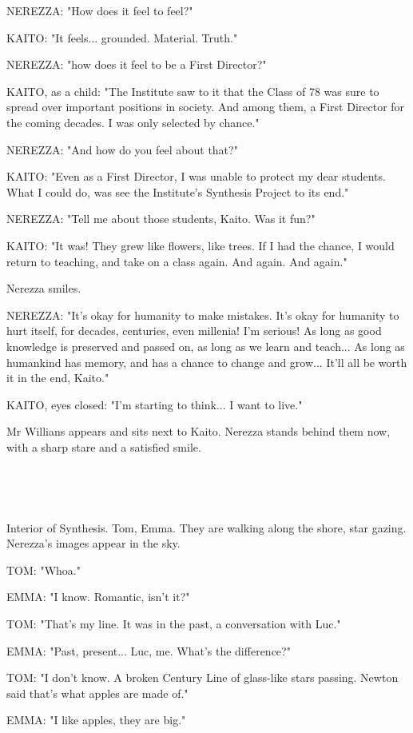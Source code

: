 \documentclass[11pt]{article}
\begin{document}
NEREZZA: "How does it feel to feel?"

KAITO: "It feels... grounded. Material. Truth."

NEREZZA: "how does it feel to be a First Director?"

KAITO, as a child: "The Institute saw to it that the Class of 78 was sure to spread over important positions in society. 
And among them, a First Director for the coming decades.
I was only selected by chance."

NEREZZA: "And how do you feel about that?"

KAITO: "Even as a First Director, I was unable to protect my dear students.
What I could do, was see the Institute's Synthesis Project to its end."

NEREZZA: "Tell me about those students, Kaito. Was it fun?"

KAITO: "It was! They grew like flowers, like trees.
If I had the chance, I would return to teaching, and take on a class again.
And again.
And again."

Nerezza smiles.

NEREZZA: "It's okay for humanity to make mistakes.
It's okay for humanity to hurt itself, for decades, centuries, even millenia!
I'm serious!
As long as good knowledge is preserved and passed on, as long as we learn and teach...
As long as humankind has memory, and has a chance to change and grow...
It'll all be worth it in the end, Kaito."

KAITO, eyes closed: "I'm starting to think...
I want to live."

Mr Willians appears and sits next to Kaito.
Nerezza stands behind them now, with a sharp stare and a satisfied smile.

\ 

\ 

Interior of Synthesis.
Tom, Emma.
They are walking along the shore, star gazing.
Nerezza's images appear in the sky.

TOM: "Whoa."

EMMA: "I know. Romantic, isn't it?"

TOM: "That's my line.
It was in the past, a conversation with Luc."

EMMA: "Past, present... Luc, me. What's the difference?"

TOM: "I don't know. 
A broken Century Line of glass-like stars passing.
Newton said that's what apples are made of."

EMMA: "I like apples, they are big."
\end{document}
